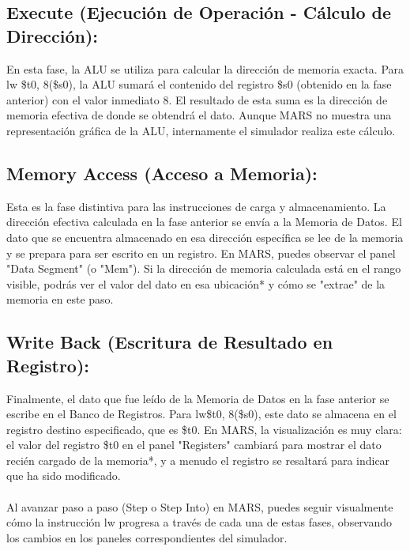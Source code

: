 \documentclass{article}
\begin{document}
\subsection{Execute (Ejecución de Operación - Cálculo de Dirección): }
 En esta fase, la ALU se utiliza para calcular la dirección de memoria exacta. Para lw \$t0, 8(\$s0), la ALU sumará el contenido del registro \$s0 (obtenido en la fase anterior) con el valor inmediato 8. El resultado de esta suma es la dirección de memoria efectiva de donde se obtendrá el dato. Aunque MARS no muestra una representación gráfica de la ALU, internamente el simulador realiza este cálculo.
\subsection{Memory Access (Acceso a Memoria): }
Esta es la fase distintiva para las instrucciones de carga y almacenamiento. La dirección efectiva calculada en la fase anterior se envía a la Memoria de Datos. El dato que se encuentra almacenado en esa dirección específica se lee de la memoria y se prepara para ser escrito en un registro. En MARS, puedes observar el panel "Data Segment" (o "Mem"). Si la dirección de memoria calculada está en el rango visible, podrás ver el valor del dato en esa ubicación* y cómo se "extrae" de la memoria en este paso.
\subsection{Write Back (Escritura de Resultado en Registro): }
Finalmente, el dato que fue leído de la Memoria de Datos en la fase anterior se escribe en el Banco de Registros. Para lw\$t0, 8(\$s0), este dato se almacena en el registro destino especificado, que es \$t0. En MARS, la visualización es muy clara: el valor del registro \$t0 en el panel "Registers" cambiará para mostrar el dato recién cargado de la memoria*, y a menudo el registro se resaltará para indicar que ha sido modificado.
\\
\\Al avanzar paso a paso (Step o Step Into) en MARS, puedes seguir visualmente cómo la instrucción lw progresa a través de cada una de estas fases, observando los cambios en los paneles correspondientes del simulador.
\end{document}
